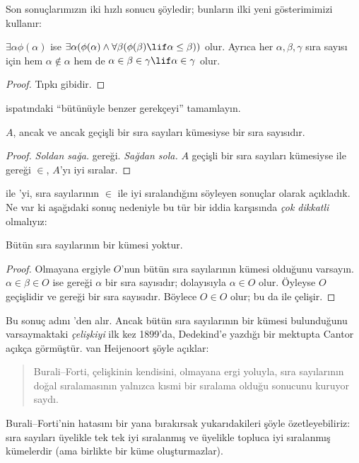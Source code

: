 \documentclass[../../../include/open-logic-section]{subfiles}
\begin{document}
Son sonuçlarımızın iki hızlı sonucu şöyledir; bunların ilki yeni gösterimimizi
kullanır:

\begin{cor}
$\exists\alpha\phi(\alpha)$ ise
$\exists\alpha(\phi(\alpha)\land\forall\beta(\phi(\beta)\lif
\alpha\leq\beta))$ olur. Ayrıca her $\alpha,\beta,\gamma$ sıra sayısı için
hem $\alpha\notin\alpha$ hem de
$\alpha\in\beta\in\gamma\lif\alpha\in\gamma$ olur.
\end{cor}

\begin{proof}
Tıpkı  gibidir.
\end{proof}

\begin{prob}
 ispatındaki ``bütünüyle benzer
gerekçeyi'' tamamlayın.
\end{prob}

\begin{cor}
$A$, ancak ve ancak geçişli bir sıra sayıları kümesiyse bir sıra sayısıdır.
\end{cor}

\begin{proof}
\emph{Soldan sağa.}  gereği. \emph{Sağdan sola.}
$A$ geçişli bir sıra sayıları kümesiyse  ile
 gereği $\in$, $A$'yı iyi sıralar.
\end{proof}

 ile 'yi, sıra sayılarının
$\in$ ile iyi sıralandığını söyleyen sonuçlar olarak açıkladık. Ne var ki
aşağıdaki sonuç nedeniyle bu tür bir iddia karşısında \emph{çok dikkatli}
olmalıyız:

\begin{thm}
Bütün sıra sayılarının bir kümesi yoktur.
\end{thm}

\begin{proof}
Olmayana ergiyle $O$'nun bütün sıra sayılarının kümesi olduğunu varsayın.
$\alpha\in\beta\in O$ ise  gereği $\alpha$ bir sıra
sayısıdır; dolayısıyla $\alpha\in O$ olur. Öyleyse $O$ geçişlidir ve
 gereği bir sıra sayısıdır. Böylece $O\in O$
olur; bu da  ile çelişir.
\end{proof}
\noindent
Bu sonuç adını \citeauthor{Burali-Forti1897}'den alır. Ancak bütün sıra
sayılarının bir kümesi bulunduğunu varsaymaktaki \emph{çelişkiyi} ilk kez
1899'da, Dedekind'e yazdığı bir mektupta Cantor açıkça görmüştür. van
Heijenoort şöyle açıklar:
\begin{quote}
  Burali--Forti, çelişkinin kendisini, olmayana ergi yoluyla, sıra
  sayılarının doğal sıralamasının yalnızca kısmi bir sıralama olduğu
  sonucunu kuruyor saydı.
  \citep[s.~105]{Heijenoort1967}
\end{quote}
Burali--Forti'nin hatasını bir yana bırakırsak yukarıdakileri şöyle
özetleyebiliriz: sıra sayıları üyelikle tek tek iyi sıralanmış ve üyelikle
topluca iyi sıralanmış kümelerdir (ama birlikte bir küme oluşturmazlar).
\end{document}
